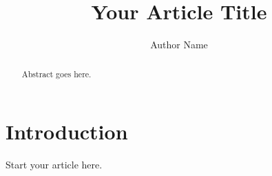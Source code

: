 \documentclass{article}
\begin{document}
\title{Your Article Title}
\author{Author Name}
\maketitle
\begin{abstract}
Abstract goes here.
\end{abstract}
\section{Introduction}
Start your article here.
\end{document}
